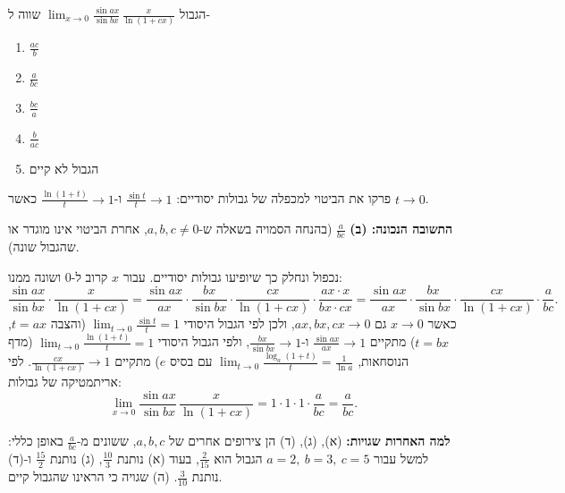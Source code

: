 
\begin{question}
הגבול $\displaystyle\lim_{x\to 0}\frac{\sin ax}{\sin bx}\,\frac{x}{\ln(1+cx)}$ שווה ל-
\begin{enumerate}
  \item $\frac{ac}{b}$
  \item $\frac{a}{bc}$
  \item $\frac{bc}{a}$
  \item $\frac{b}{ac}$
  \item הגבול לא קיים
\end{enumerate}
\end{question}

\begin{hint}
פרקו את הביטוי למכפלה של גבולות יסודיים: $\frac{\sin t}{t}\to 1$ ו-$\frac{\ln(1+t)}{t}\to 1$ כאשר $t\to 0$.
\end{hint}

\begin{solution}
\textbf{התשובה הנכונה: (ב)} $\frac{a}{bc}$ (בהנחה הסמויה בשאלה ש-$a,b,c\neq 0$, אחרת הביטוי אינו מוגדר או שהגבול שונה).

נכפול ונחלק כך שיופיעו גבולות יסודיים. עבור $x$ קרוב ל-0 ושונה ממנו:
\[
\frac{\sin ax}{\sin bx}\cdot\frac{x}{\ln(1+cx)}
=\frac{\sin ax}{ax}\cdot\frac{bx}{\sin bx}\cdot\frac{cx}{\ln(1+cx)}\cdot\frac{ax\cdot x}{bx\cdot cx}
=\frac{\sin ax}{ax}\cdot\frac{bx}{\sin bx}\cdot\frac{cx}{\ln(1+cx)}\cdot\frac{a}{bc}.
\]
כאשר $x\to 0$ גם $ax,bx,cx\to 0$, ולכן לפי הגבול היסודי $\lim_{t\to 0}\frac{\sin t}{t}=1$ (והצבה $t=ax$, $t=bx$) מתקיים
$\frac{\sin ax}{ax}\to 1$ ו-$\frac{bx}{\sin bx}\to 1$, ולפי הגבול היסודי $\lim_{t\to 0}\frac{\ln(1+t)}{t}=1$ (מדף הנוסחאות, $\lim_{t\to0}\frac{\log_a(1+t)}{t}=\frac{1}{\ln a}$ עם בסיס $e$) מתקיים $\frac{cx}{\ln(1+cx)}\to 1$.
לפי אריתמטיקה של גבולות:
\[
\lim_{x\to 0}\frac{\sin ax}{\sin bx}\,\frac{x}{\ln(1+cx)}=1\cdot 1\cdot 1\cdot\frac{a}{bc}=\boxed{\frac{a}{bc}}.
\]

\textbf{למה האחרות שגויות:} (א), (ג), (ד) הן צירופים אחרים של $a,b,c$, ששונים מ-$\frac{a}{bc}$ באופן כללי: למשל עבור $a=2,\ b=3,\ c=5$ הגבול הוא $\frac{2}{15}$, בעוד (א) נותנת $\frac{10}{3}$, (ג) נותנת $\frac{15}{2}$ ו-(ד) נותנת $\frac{3}{10}$. (ה) שגויה כי הראינו שהגבול קיים.
\end{solution}

